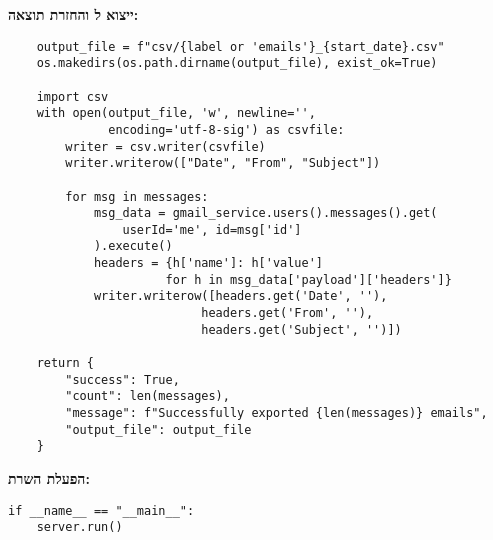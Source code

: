 \textbf{ייצוא ל והחזרת תוצאה:}

\begin{english}
\begin{verbatim}
    output_file = f"csv/{label or 'emails'}_{start_date}.csv"
    os.makedirs(os.path.dirname(output_file), exist_ok=True)

    import csv
    with open(output_file, 'w', newline='',
              encoding='utf-8-sig') as csvfile:
        writer = csv.writer(csvfile)
        writer.writerow(["Date", "From", "Subject"])

        for msg in messages:
            msg_data = gmail_service.users().messages().get(
                userId='me', id=msg['id']
            ).execute()
            headers = {h['name']: h['value']
                      for h in msg_data['payload']['headers']}
            writer.writerow([headers.get('Date', ''),
                           headers.get('From', ''),
                           headers.get('Subject', '')])

    return {
        "success": True,
        "count": len(messages),
        "message": f"Successfully exported {len(messages)} emails",
        "output_file": output_file
    }
\end{verbatim}
\end{english}

\textbf{הפעלת השרת:}

\begin{english}
\begin{verbatim}
if __name__ == "__main__":
    server.run()
\end{verbatim}
\end{english}
